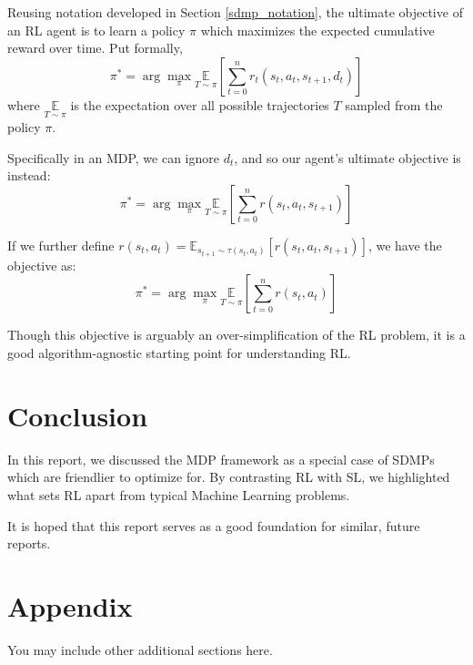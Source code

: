 \documentclass{article} %
\begin{document}
Reusing notation developed in Section \ref{sdmp_notation}, the ultimate objective of an RL agent is to learn a policy $\pi$ which maximizes the expected cumulative reward over time. Put formally,
\begin{equation} \label{sdmp_obj}
      \pi^* = \arg\max_\pi \underset{T \sim \pi}{\mathbb{E}} \left[ \sum_{t=0}^{n} r_t(s_t, a_t, s_{t+1}, d_t) \right]
\end{equation}
where $\underset{T \sim \pi}{\mathbb{E}}$ is the expectation over all possible trajectories $T$ sampled from the policy $\pi$.

Specifically in an MDP, we can ignore $d_t$, and so our agent's ultimate objective is instead:
\begin{equation} \label{mdp_obj}
    \pi^* = \arg\max_\pi \underset{T \sim \pi}{\mathbb{E}} \left[ \sum_{t=0}^{n} r(s_t, a_t, s_{t + 1}) \right]
\end{equation}

If we further define $r(s_t, a_t) = \mathbb{E}_{s_{t + 1} \sim \tau(s_t, a_t)}[r(s_t, a_t, s_{t + 1})]$, 
we have the objective as:
\begin{equation} \label{mdp_obj_concise}
   \pi^* = \arg\max_\pi \underset{T \sim \pi}{\mathbb{E}} \left[ \sum_{t=0}^{n} r(s_t, a_t) \right]
\end{equation}

Though this objective is arguably an over-simplification of the RL problem,
it is a good algorithm-agnostic starting point for understanding RL.

\section{Conclusion}

In this report, we discussed the MDP framework as a special case of SDMPs which are friendlier to optimize for.
By contrasting RL with SL, we highlighted what sets RL apart from typical Machine Learning problems.

It is hoped that this report serves as a good foundation for similar, future reports.




\appendix
\section{Appendix}
You may include other additional sections here.
\end{document}
